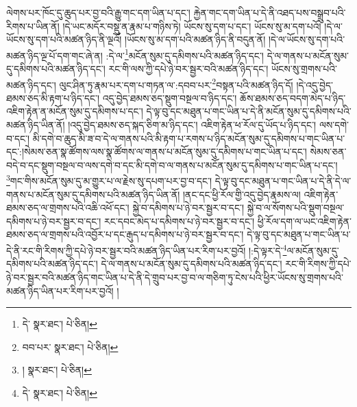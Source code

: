 ལེགས་པར་ཁོང་དུ་ཆུད་པར་བྱ་བའི་རྒྱུ་གང་དག་ཡིན་པ་དང་། རྐྱེན་གང་དག་ཡིན་པ་དེ་ནི་འཐད་པས་བསྒྲུབ་པའི་རིགས་པ་ཡིན་ནོ། །དེ་ཡང་མདོར་བསྡུ་ན་རྣམ་པ་གཉིས་ཏེ། ཡོངས་སུ་དག་པ་དང་། ཡོངས་སུ་མ་དག་པའོ། །དེ་ལ་ཡོངས་སུ་དག་པའི་མཚན་ཉིད་ནི་ལྔའོ། །ཡོངས་སུ་མ་དག་པའི་མཚན་ཉིད་ནི་བདུན་ནོ། །དེ་ལ་ཡོངས་སུ་དག་པའི་མཚན་ཉིད་ལྔ་པོ་དག་གང་ཞེ་ན། :དེ་ལ་\footnote{དེ་  སྣར་ཐང་།  པེ་ཅིན། }མངོན་སུམ་དུ་དམིགས་པའི་མཚན་ཉིད་དང་། དེ་ལ་གནས་པ་མངོན་སུམ་དུ་དམིགས་པའི་མཚན་ཉིད་དང་། རང་གི་ལས་ཀྱི་དཔེ་ཉེ་བར་སྦྱར་བའི་མཚན་ཉིད་དང་། ཡོངས་སུ་གྲགས་པའི་མཚན་ཉིད་དང་། ལུང་ཤིན་ཏུ་རྣམ་པར་དག་པ་གཏན་ལ་:དབབ་པར་\footnote{བབ་པར་  སྣར་ཐང་།  པེ་ཅིན། }བསྟན་པའི་མཚན་ཉིད་དོ། །དེ་འདུ་བྱེད་ཐམས་ཅད་མི་རྟག་པ་ཉིད་དང་། འདུ་བྱེད་ཐམས་ཅད་སྡུག་བསྔལ་བ་ཉིད་དང་། ཆོས་ཐམས་ཅད་བདག་མེད་པ་ཉིད་འཇིག་རྟེན་ན་མངོན་སུམ་དུ་དམིགས་པ་དང་། དེ་ལྟ་བུ་དང་མཐུན་པ་གང་ཡིན་པ་དེ་ནི་མངོན་སུམ་དུ་དམིགས་པའི་མཚན་ཉིད་ཡིན་ནོ། །འདུ་བྱེད་ཐམས་ཅད་སྐད་ཅིག་མ་ཉིད་དང་། འཇིག་རྟེན་ཕ་རོལ་དུ་ཡོད་པ་ཉིད་དང་། ལས་དགེ་བ་དང་། མི་དགེ་བ་ཆུད་མི་ཟ་བ་དེ་ལ་གནས་པའི་མི་རྟག་པ་རགས་པ་ཉིད་མངོན་སུམ་དུ་དམིགས་པ་གང་ཡིན་པ་དང་:།སེམས་ཅན་སྣ་ཚོགས་ལས་སྣ་ཚོགས་ལ་གནས་པ་མངོན་སུམ་དུ་དམིགས་པ་གང་ཡིན་པ་དང་། སེམས་ཅན་བདེ་བ་དང་སྡུག་བསྔལ་བ་ལས་དགེ་བ་དང་མི་དགེ་བ་ལ་གནས་པ་མངོན་སུམ་དུ་དམིགས་པ་གང་ཡིན་པ་དང་། \footnote{།   སྣར་ཐང་།  པེ་ཅིན། }གང་གིས་མངོན་སུམ་དུ་མ་གྱུར་པ་ལ་རྗེས་སུ་དཔག་པར་བྱ་བ་དང་། དེ་ལྟ་བུ་དང་མཐུན་པ་གང་ཡིན་པ་དེ་ནི་དེ་ལ་གནས་པ་མངོན་སུམ་དུ་དམིགས་པའི་མཚན་ཉིད་ཡིན་ནོ། །ནང་དང་ཕྱི་རོལ་གྱི་འདུ་བྱེད་རྣམས་ལ། འཇིག་རྟེན་ཐམས་ཅད་ལ་གྲགས་པའི་འཆི་འཕོ་དང་། སྐྱེ་བ་དམིགས་པ་ཉེ་བར་སྦྱར་བ་དང་། སྐྱེ་བ་ལ་སོགས་པའི་སྡུག་བསྔལ་དམིགས་པ་ཉེ་བར་སྦྱར་བ་དང་། རང་དབང་མེད་པ་དམིགས་པ་ཉེ་བར་སྦྱར་བ་དང་། ཕྱི་རོལ་དག་ལ་ཡང་འཇིག་རྟེན་ཐམས་ཅད་ལ་གྲགས་པའི་འབྱོར་པ་དང་རྒུད་པ་དམིགས་པ་ཉེ་བར་སྦྱར་བ་དང་། དེ་ལྟ་བུ་དང་མཐུན་པ་གང་ཡིན་པ་དེ་ནི་རང་གི་རིགས་ཀྱི་དཔེ་ཉེ་བར་སྦྱར་བའི་མཚན་ཉིད་ཡིན་པར་རིག་པར་བྱའོ། །:དེ་ལྟར་དེ་\footnote{དེ་  སྣར་ཐང་།  པེ་ཅིན། }ལ་མངོན་སུམ་དུ་དམིགས་པའི་མཚན་ཉིད་དང་། དེ་ལ་གནས་པ་མངོན་སུམ་དུ་དམིགས་པའི་མཚན་ཉིད་དང་། རང་གི་རིགས་ཀྱི་དཔེ་ཉེ་བར་སྦྱར་བའི་མཚན་ཉིད་གང་ཡིན་པ་དེ་ནི་དེ་གྲུབ་པར་བྱ་བ་ལ་གཅིག་ཏུ་ངེས་པའི་ཕྱིར་ཡོངས་སུ་གྲགས་པའི་མཚན་ཉིད་ཡིན་པར་རིག་པར་བྱའོ། །
